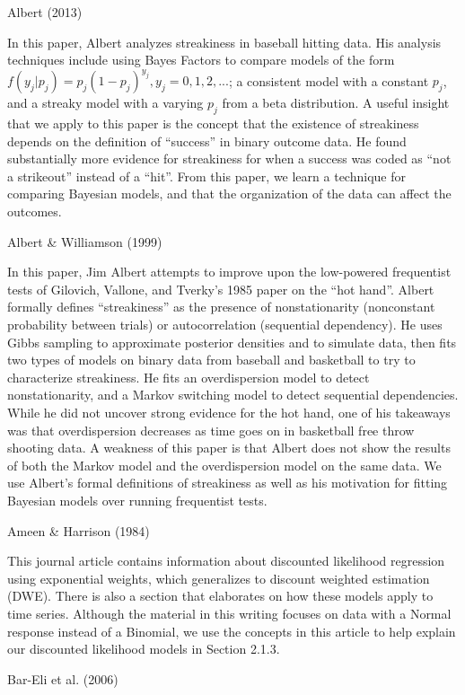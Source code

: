 \documentclass[12pt,twoside]{dukestatscithesis}
\theoremstyle{definition}
\theoremstyle{definition}
\theoremstyle{definition}
\theoremstyle{remark}
\begin{document}
Albert (2013)

In this paper, Albert analyzes streakiness in baseball hitting data. His
analysis techniques include using Bayes Factors to compare models of the
form \(f(y_j|p_j) = p_j(1-p_j)^{y_j}, y_j = 0,1,2,...\); a consistent
model with a constant \(p_j\), and a streaky model with a varying
\(p_j\) from a beta distribution. A useful insight that we apply to this
paper is the concept that the existence of streakiness depends on the
definition of ``success'' in binary outcome data. He found substantially
more evidence for streakiness for when a success was coded as ``not a
strikeout'' instead of a ``hit''. From this paper, we learn a technique
for comparing Bayesian models, and that the organization of the data can
affect the outcomes.

Albert \& Williamson (1999)

In this paper, Jim Albert attempts to improve upon the low-powered
frequentist tests of Gilovich, Vallone, and Tverky's 1985 paper on the
``hot hand''. Albert formally defines ``streakiness'' as the presence of
nonstationarity (nonconstant probability between trials) or
autocorrelation (sequential dependency). He uses Gibbs sampling to
approximate posterior densities and to simulate data, then fits two
types of models on binary data from baseball and basketball to try to
characterize streakiness. He fits an overdispersion model to detect
nonstationarity, and a Markov switching model to detect sequential
dependencies. While he did not uncover strong evidence for the hot hand,
one of his takeaways was that overdispersion decreases as time goes on
in basketball free throw shooting data. A weakness of this paper is that
Albert does not show the results of both the Markov model and the
overdispersion model on the same data. We use Albert's formal
definitions of streakiness as well as his motivation for fitting
Bayesian models over running frequentist tests.

Ameen \& Harrison (1984)

This journal article contains information about discounted likelihood
regression using exponential weights, which generalizes to discount
weighted estimation (DWE). There is also a section that elaborates on
how these models apply to time series. Although the material in this
writing focuses on data with a Normal response instead of a Binomial, we
use the concepts in this article to help explain our discounted
likelihood models in Section 2.1.3.

Bar-Eli et al. (2006)
\end{document}
